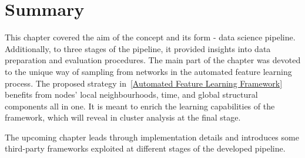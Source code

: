 \section{Summary}
This chapter covered the aim of the concept and its form - data science pipeline. Additionally, to three stages of the pipeline, it provided insights into data preparation and evaluation procedures. The main part of the chapter was devoted to the unique way of sampling from networks in the automated feature learning process. The proposed strategy in~\ref{Automated Feature Learning Framework} benefits from nodes' local neighbourhoods, time, and global structural components all in one. It is meant to enrich the learning capabilities of the framework, which will reveal in cluster analysis at the final stage.

The upcoming chapter leads through implementation details and introduces some third-party frameworks exploited at different stages of the developed pipeline.


